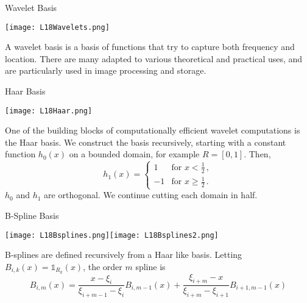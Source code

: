 \documentclass[10pt, table, dvipsnames,xcdraw,handout]{beamer}
\begin{document}
\begin{frame}[fragile]{Wavelet Basis}
  \begin{minipage}[t][0.5\textheight][t]{\textwidth}
	\centering \texttt{[image: L18Wavelets.png]} 
  \end{minipage}
  \vfill
\begin{minipage}[t][0.5\textheight][t]{\textwidth}
A wavelet basis is a basis of functions that try to capture both frequency and location. There are many adapted to various theoretical and practical uses, and are particularly used in image processing and storage. 
\end{minipage}
\end{frame}



\begin{frame}[fragile]{Haar Basis}
  \begin{minipage}[t][0.5\textheight][t]{\textwidth}
	\centering \texttt{[image: L18Haar.png]} 
  \end{minipage}
  \vfill
\begin{minipage}[t][0.5\textheight][t]{\textwidth}
One of the building blocks of computationally efficient wavelet computations is the Haar basis.  We construct the basis recursively, starting with a constant function $h_0(x)$ on a bounded domain, for example $R = [0,1]$. \pause Then,
$$
h_1(x) = \begin{cases}
1&\text{for } x<\frac12\,,\\
-1&\text{for }x\geq \frac12\,.
\end{cases}
$$\pause
$h_0$ and $h_1$ are orthogonal. We continue cutting each domain in half. 
\end{minipage}
\end{frame}




\begin{frame}[fragile]{B-Spline Basis}
  \begin{minipage}[t][0.5\textheight][t]{\textwidth}
	\centering \texttt{[image: L18Bsplines.png]}\texttt{[image: L18Bsplines2.png]} 
  \end{minipage}
  \vfill
\begin{minipage}[t][0.5\textheight][t]{\textwidth}
B-splines are defined recursively from a Haar like basis. Letting $B_{i,k}(x) = \mathds{1}_{R_k}(x)$, the order $m$ spline is 
$$
B_{i,m}(x) = \frac{x - \xi_i}{\xi_{i+m-1}-\xi_i}B_{i,m-1}(x) + \frac {\xi_{i+m} - x}{\xi_{i+m}-\xi_{i+1}}B_{i+1,m-1}(x)
$$
\end{minipage}
\end{frame}
\end{document}
